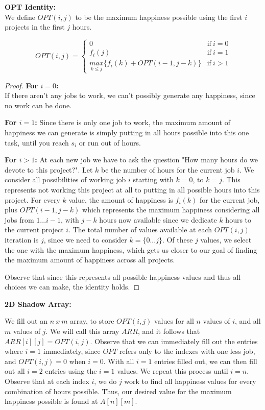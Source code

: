 \documentclass[11pt]{article}
\begin{document}
\textbf{OPT Identity: }\\
We define $OPT(i,j)$ to be the maximum happiness possible using the first $i$ projects in the first $j$ hours.

\begin{equation}
	OPT(i,j) = 
	\begin{cases}
	0 & \text{if} \ i = 0\\
	f_i(j) & \text{if} \ i = 1\\
	\underset{k \leq j}{max} \{f_i(k) + OPT(i-1, j-k)\} & \text{if} \ i > 1
	\end{cases}
\end{equation}

\begin{proof}
\textbf{For $i = 0$:}\\
If there aren't any jobs to work, we can't possibly generate any happiness, since no work can be done.

\textbf{For $i = 1$:}
Since there is only one job to work, the maximum amount of happiness we can generate is simply putting in all hours possible into this one task, until you reach $s_i$ or run out of hours.

\textbf{For $i>1$:}
At each new job we have to ask the question "How many hours do we devote to this project?". Let $k$ be the number of hours for the current job $i$. We consider all possibilities of working job $i$ starting with $k=0$, to $k=j$. This represents not working this project at all to putting in all possible hours into this project. For every $k$ value, the amount of happiness is $f_i(k)$ for the current job, plus $OPT(i-1, j-k)$ which represents the maximum happiness considering all jobs from $1 ... i-1$, with $j-k$ hours now available since we dedicate $k$ hours to the current project $i$. The total number of values available at each $OPT(i, j)$ iteration is $j$, since we need to consider $k = \{0...j\}$. Of these $j$ values, we select the one with the maximum happiness, which gets us closer to our goal of finding the maximum amount of happiness across all projects.

Observe that since this represents all possible happiness values and thus all choices we can make, the identity holds.
\end{proof}

\textbf{2D Shadow Array: }

We fill out an $n\ x\ m$ array, to store $OPT(i,j)$ values for all $n$ values of $i$, and all $m$ values of $j$. We will call this array $ARR$, and it follows that $ARR[i][j] = OPT(i, j)$. Observe that we can immediately fill out the entries where $i = 1$ immediately, since $OPT$ refers only to the indexes with one less job, and $OPT(i, j) = 0$ when $i = 0$. With all $i = 1$ entries filled out, we can then fill out all $i = 2$ entries using the $i = 1$ values. We repeat this process until $i = n$. Observe that at each index $i$, we do $j$ work to find all happiness values for every combination of hours possible. Thus, our desired value for the maximum happiness possible is found at $A[n][m]$.
\end{document}
